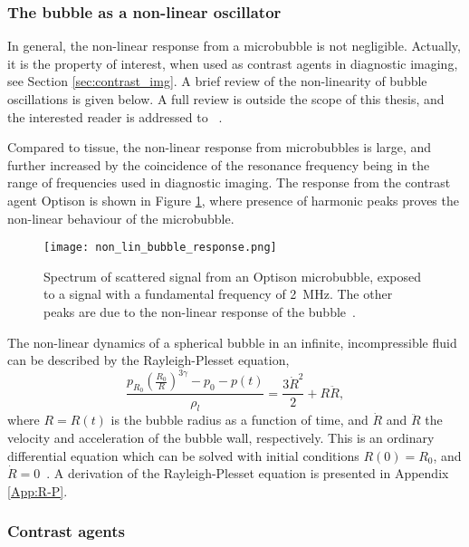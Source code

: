 \subsubsection{The bubble as a non-linear oscillator}
In general, the non-linear response from a microbubble is not negligible. Actually, it is the property of interest, when used as contrast agents in diagnostic imaging, see Section \ref{sec:contrast_img}. A brief review of the non-linearity of bubble oscillations is given below. A full review is outside the scope of this thesis, and the interested reader is addressed to ~\citet{Hoff2000}. 

Compared to tissue, the non-linear response from microbubbles is large, and further increased by the coincidence of the resonance frequency being in the range of frequencies used in diagnostic imaging. The response from the contrast agent Optison\texttrademark{}  is shown in Figure \ref{Fig:bub_response}, where presence of harmonic peaks proves the non-linear behaviour of the microbubble. 

\begin{figure}[h]
  \centering
  \texttt{[image: non\_lin\_bubble\_response.png]}
  \caption{Spectrum of scattered signal from an Optison\texttrademark{} microbubble, exposed to a signal with a fundamental frequency of \SI{2}{\mega\hertz}. The other peaks are due to the non-linear response of the bubble~\cite{Shi1999}.}
  \label{Fig:bub_response}
\end{figure}
The non-linear dynamics of a spherical bubble in an infinite, incompressible fluid can be described by the Rayleigh-Plesset equation,
\begin{equation}
\label{r-p}
\frac{p_{R_0}\left(\frac{R_0}{R}\right)^{3\gamma}-p_0 - p(t)}{\rho_l} = \frac{3\dot{R}^2}{2}+R\ddot{R},
\end{equation}
where $R = R(t)$ is the bubble radius as a function of time, and $\dot{R}$ and $\ddot{R}$ the velocity and acceleration of the bubble wall, respectively. This is an ordinary differential equation which can be solved with initial conditions $R(0) = R_0$, and $\dot{R} = 0$~\cite{Moss2014}. A derivation of the Rayleigh-Plesset equation is presented in Appendix \ref{App:R-P}.

 
\clearpage
\subsubsection{Contrast agents}
\label{contrast agents}

